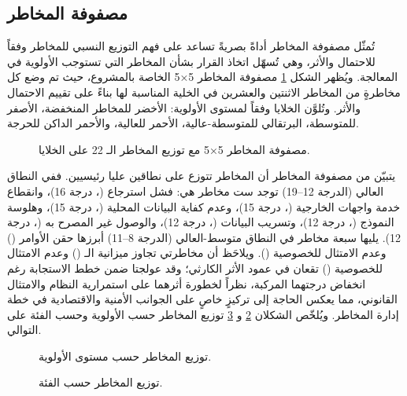 \subsection{مصفوفة المخاطر}
\label{subsec:risk-matrix}

تُمثّل مصفوفة المخاطر أداةً بصريةً تساعد على فهم التوزيع النسبي للمخاطر وفقاً للاحتمال والأثر، وهي تُسهّل اتخاذ القرار بشأن المخاطر التي تستوجب الأولوية في المعالجة. ويُظهر الشكل \ref{fig:risk-matrix} مصفوفة المخاطر 5×5 الخاصة بالمشروع، حيث تم وضع كل مخاطرةٍ من المخاطر الاثنتين والعشرين في الخلية المناسبة لها بناءً على تقييم الاحتمال والأثر. وتُلوَّن الخلايا وفقاً لمستوى الأولوية: الأخضر للمخاطر المنخفضة، الأصفر للمتوسطة، البرتقالي للمتوسطة-عالية، الأحمر للعالية، والأحمر الداكن للحرجة.

\begin{figure}[H]
  \centering
  
  \caption{مصفوفة المخاطر 5×5 مع توزيع المخاطر الـ 22 على الخلايا.}
  \label{fig:risk-matrix}
\end{figure}

يتبيّن من مصفوفة المخاطر أن المخاطر تتوزع على نطاقين عليا رئيسيين. ففي النطاق العالي (الدرجة 12--19) توجد ست مخاطر هي: فشل استرجاع  (، درجة 16)، وانقطاع خدمة واجهات  الخارجية (، درجة 15)، وعدم كفاية البيانات المحلية (، درجة 15)، وهلوسة النموذج (، درجة 12)، وتسريب البيانات (، درجة 12)، والوصول غير المصرح به (، درجة 12). يليها سبعة مخاطر في النطاق متوسط-العالي (الدرجة 8--11) أبرزها حقن الأوامر () وعدم الامتثال للخصوصية (). ويلاحَظ أن مخاطرتي تجاوز ميزانية الـ  () وعدم الامتثال للخصوصية () تقعان في عمود الأثر الكارثي؛ وقد عولجتا ضمن خطط الاستجابة رغم انخفاض درجتهما المركبة، نظراً لخطورة أثرهما على استمرارية النظام والامتثال القانوني، مما يعكس الحاجة إلى تركيزٍ خاصٍ على الجوانب الأمنية والاقتصادية في خطة إدارة المخاطر. ويُلخّص الشكلان \ref{fig:risk-priority-distribution} و \ref{fig:risk-category-distribution} توزيع المخاطر حسب الأولوية وحسب الفئة على التوالي.

\begin{figure}[H]
  \centering
  
  \caption{توزيع المخاطر حسب مستوى الأولوية.}
  \label{fig:risk-priority-distribution}
\end{figure}

\begin{figure}[H]
  \centering
  
  \caption{توزيع المخاطر حسب الفئة.}
  \label{fig:risk-category-distribution}
\end{figure}


